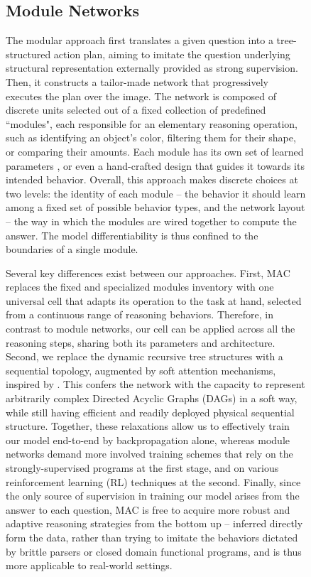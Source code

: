 \documentclass[fleqn]{article}
\begin{document}
\begin{figure}[t]
\begin{minipage}{0.55\textwidth}
\subsection{Module Networks}

The modular approach \citep{nmn,nmn2,nmn3,pgee} first translates a given question into a tree-structured action plan, aiming to imitate the question underlying structural representation externally provided as strong supervision. Then, it constructs a tailor-made network that progressively executes the plan over the image. The network is composed of discrete units selected out of a fixed collection of predefined ``modules", each responsible for an elementary reasoning operation, such as identifying an object's color, filtering them for their shape, or comparing their amounts. Each module has its own set of learned parameters \citep{pgee}, or even a hand-crafted design \citep{nmn} that guides it towards its intended behavior. Overall, this approach makes discrete choices at two levels: the identity of each module -- the behavior it should learn among a fixed set of possible behavior types, and the network layout -- the way in which the modules are wired together to compute the answer. The model differentiability is thus confined to the boundaries of a single module. 

Several key differences exist between our approaches. First, MAC replaces the fixed and specialized modules inventory with one universal cell that adapts its operation to the task at hand, selected from a continuous range of reasoning behaviors. Therefore, in contrast to module networks, our cell can be applied across all the reasoning steps, sharing both its parameters and architecture. Second, we replace the dynamic recursive tree structures with a sequential topology, augmented by soft attention mechanisms, inspired by \citet{alignTrans}. This confers the network with the capacity to represent arbitrarily complex Directed Acyclic Graphs (DAGs) in a soft way, while still having efficient and readily deployed physical sequential structure. Together, these relaxations allow us to effectively train our model end-to-end by backpropagation alone, whereas module networks demand more involved training schemes that rely on the strongly-supervised programs at the first stage, and on various reinforcement learning (RL) techniques at the second. Finally, since the only source of supervision in training our model arises from the answer to each question, MAC is free to acquire more robust and adaptive reasoning strategies from the bottom up -- inferred directly form the data, rather than trying to imitate the behaviors dictated by brittle parsers or closed domain functional programs, and is thus more applicable to real-world settings.    


\end{minipage}
\end{figure}
\end{document}
